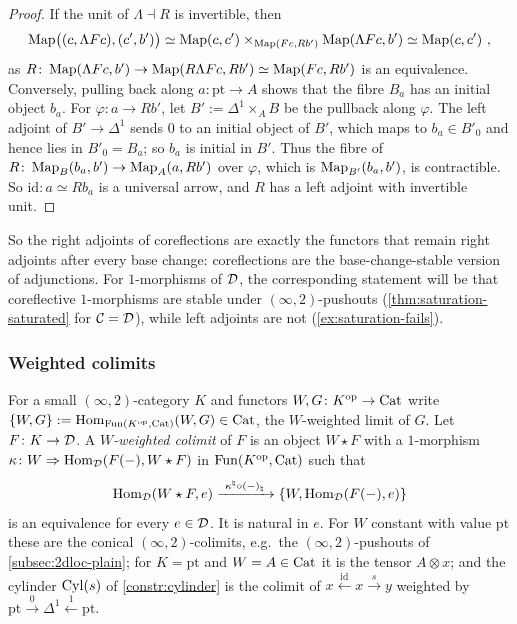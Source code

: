 \begin{proof}
%
If the unit of $\Lambda \dashv R$ is invertible, then
\begin{equation*}
\mapp\bigl((c,\Lambda Fc),(c',b')\bigr) \simeq \mapp(c,c')
\times_{\mapp(Fc,Rb')} \mapp(\Lambda Fc,b') \simeq \mapp(c,c') \ ,
\end{equation*}
as
$R\colon \operatorname{Map}(\Lambda Fc,b') \to \operatorname{Map}(R\Lambda Fc,Rb') \simeq \operatorname{Map}(Fc,Rb')$
is an equivalence.
Conversely, pulling back along
$a\colon \mathrm{pt} \to A$
shows that the fibre $B_{a}$ has an initial object $b_{a}$. For
$\varphi\colon a \to Rb'$,
let
$B' := \Delta^{1} \times_{A} B$
be the pullback along $\varphi$. The left adjoint of $B' \to \Delta^{1}$ sends
$0$ to an initial object of $B'$, which maps to $b_{a} \in B'_{0}$ and hence
lies in $B'_{0} = B_{a}$; so $b_{a}$ is initial in $B'$. Thus the fibre of
$R\colon \operatorname{Map}_{B}(b_{a},b') \to \operatorname{Map}_{A}(a,Rb')$
over $\varphi$, which is $\operatorname{Map}_{B'}(b_{a},b')$, is contractible. So
$\mathrm{id}\colon a \simeq Rb_{a}$
is a universal arrow, and $R$ has a left adjoint with invertible unit.
\end{proof}

%
So the right adjoints of coreflections are exactly the functors that remain
right adjoints after every base change: coreflections are the base-change-stable
version of adjunctions. For $1$-morphisms of $\mathcal{D}$,
the corresponding statement will be that coreflective $1$-morphisms are stable
under $(\infty,2)$-pushouts (\cref{thm:saturation-saturated} for $\mathcal{C} = \mathcal{D}$),
while left adjoints are not (\cref{ex:saturation-fails}).

\subsubsection*{Weighted colimits}
%
For a small $(\infty,2)$-category $K$ and functors
$W, G\colon K^{\mathrm{op}} \to \mathrm{Cat}$
write
$\{W,G\} := \operatorname{Hom}_{\operatorname{Fun}(K^{\mathrm{op}},\mathrm{Cat})}(W,G) \in \mathrm{Cat}$,
the $W$-weighted limit of $G$.
Let $F\colon K \to \mathcal{D}$. A \emph{$W$-weighted colimit} of $F$ is an object $W
\star F$ with a $1$-morphism
$\kappa\colon W \Rightarrow \operatorname{Hom}_{\mathcal{D}}(F(-),W \star F)$
in $\operatorname{Fun}(K^{\mathrm{op}},\mathrm{Cat})$ such that
\begin{equation*}
\Hom_{\D}(W \star F,e) \xrightarrow{\ \kappa^{\natural} \circ (-)_{\natural}\ }
\{W,\Hom_{\D}(F(-),e)\}
\end{equation*}
is an equivalence for every $e \in \mathcal{D}$. It is natural in $e$.
For $W$ constant with value $\mathrm{pt}$ these are the conical
$(\infty,2)$-colimits, e.g.\ the $(\infty,2)$-pushouts of
\cref{subsec:2dloc-plain}; for $K = \mathrm{pt}$ and $W = A \in \mathrm{Cat}$ it is the
tensor $A \otimes x$; and the cylinder $\mathrm{Cyl}(s)$ of \cref{constr:cylinder} is
the colimit of
$x \xleftarrow{\mathrm{id}} x \xrightarrow{s} y$
weighted by
$\mathrm{pt} \xrightarrow{0} \Delta^{1} \xleftarrow{1} \mathrm{pt}$.

